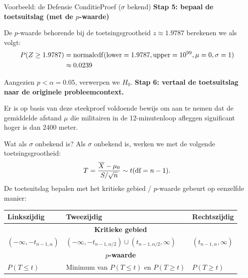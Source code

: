     \begin{frame}{Voorbeeld: de Defensie ConditieProef ($\sigma$ bekend)}
        \textbf{Stap 5: bepaal de toetsuitslag (met de $p$-waarde)}

        De $p$-waarde behorende bij de toetsingsgrootheid $z \approx 1.9787$ berekenen we als volgt:
        \begin{align*}
            P(Z \geq 1.9787)    &= \operatorname{normalcdf}(\text{lower}=1.9787, \text{upper}=10^{99}, \mu=0, \sigma=1) \\
                                &\approx 0.0239
        \end{align*}

        Aangezien $p < \alpha = 0.05$, verwerpen we $H_0$.
        \vfill\pause
        \textbf{Stap 6: vertaal de toetsuitslag naar de originele probleemcontext.}

        Er is op basis van deze steekproef voldoende bewijs om aan te nemen dat de gemiddelde afstand $\mu$ die militairen in de 12-minutenloop afleggen 
        significant hoger is dan $2400$ meter.
    \end{frame}

    \begin{frame}{Wat als $\sigma$ onbekend is?}
        Als $\sigma$ onbekend is, werken we met de volgende toetsingsgrootheid:
        \[
            T = \frac{\overline{X} - \mu_0}{S / \sqrt{n}} \sim t(\text{df} = n-1).
        \]
        \vfill\pause
        De toetsuitslag bepalen met het kritieke gebied / $p$-waarde gebeurt op eenzelfde manier:
        \begin{center}
            \renewcommand{\arraystretch}{1.3}
            \begin{tabular}{m{} m{} m{}}
                \toprule
                    \textbf{Linkszijdig} & \textbf{Tweezijdig} & \textbf{Rechtszijdig} \\ 
                \midrule
                    \multicolumn{3}{c}{\textbf{Kritieke gebied}} \\
                \midrule
                    $(-\infty, -t_{n-1,\alpha})$ & $(-\infty, -t_{n-1,\alpha/2}) \cup (t_{n-1,\alpha/2}, \infty)$ & $(t_{n-1,\alpha}, \infty)$ \\
                \midrule
                    \multicolumn{3}{c}{\textbf{$p$-waarde}} \\
                \midrule
                    $P(T \leq t)$ & Minimum van \newline $P(T \leq t)$ en $P(T \geq t)$ & $P(T \geq t)$ \\
                \bottomrule
            \end{tabular}
        \end{center}
    \end{frame}

